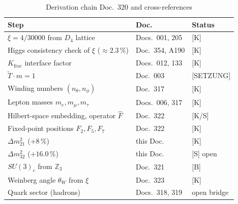 \begin{table}[h]
\centering
\caption{Derivation chain Doc.~320 and cross-references}
\label{tab:refs}
\begin{tabular}{lll}
\toprule
Step & Doc. & Status \\
\midrule
$\xi = 4/30000$ from $D_4$ lattice            & Docs.~001, 205     & [K] \\
Higgs consistency check of $\xi$ ($\approx 2.3\,\%$) & Doc.~354, A190 & [K] \\
$K_{\mathrm{frac}}$ interface factor           & Docs.~012, 133     & [K] \\
$\tilde{T}\cdot m = 1$                         & Doc.~003           & [SETZUNG] \\
Winding numbers $(n_\theta, n_\phi)$           & Doc.~317           & [K] \\
Lepton masses $m_e, m_\mu, m_\tau$             & Docs.~006, 317     & [K] \\
Hilbert-space embedding, operator $\hat{F}$    & Doc.~322           & [K/S] \\
Fixed-point positions $F_2, F_5, F_7$          & Doc.~322           & [K] \\
$\Delta m_{21}^2$ ($+8\,\%$)                  & this Doc.          & [K] \\
$\Delta m_{32}^2$ ($+16.0\,\%$)               & this Doc.          & [S] open \\
$SU(3)_c$ from $\mathbb{Z}_3$                  & Doc.~321           & [B] \\
Weinberg angle $\theta_W$ from $\xi$           & Doc.~323           & [K] \\
Quark sector (hadrons)                         & Docs.~318, 319     & open bridge \\
\bottomrule
\end{tabular}
\end{table}
